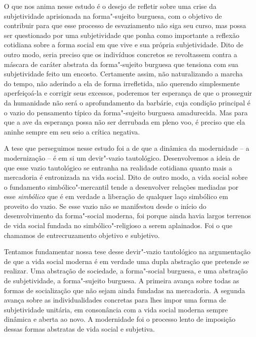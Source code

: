 O que nos anima nesse estudo é o desejo de refletir sobre uma crise da
subjetividade aprisionada na forma"-sujeito burguesa, com o objetivo de
contribuir para que esse processo de esvaziamento não siga seu curso,
mas possa ser questionado por uma subjetividade que ponha como
importante a reflexão cotidiana sobre a forma social em que vive e sua
própria subjetividade. Dito de outro modo, seria preciso que os
indivíduos concretos se revoltassem contra a máscara de caráter abstrata
da forma"-sujeito burguesa que tensiona com sua subjetividade feito um
encosto. Certamente assim, não naturalizando a marcha do tempo, não
aderindo a ela de forma irrefletida, não querendo simplesmente
aperfeiçoá-la e corrigir seus excessos, poderemos ter esperança de que o
prosseguir da humanidade não será o aprofundamento da barbárie, cuja
condição principal é o vazio do pensamento típico da forma"-sujeito
burguesa amadurecida. Mas para que a ave da esperança possa não ser
derrubada em pleno voo, é preciso que ela aninhe sempre em seu seio a
crítica negativa.

A tese que perseguimos nesse estudo foi a de que a dinâmica da
modernidade -- a modernização -- é em si um devir"-vazio tautológico.
Desenvolvemos a ideia de que esse vazio tautológico se entranha na
realidade cotidiana quanto mais a mercadoria é entronizada na vida
social. Dito de outro modo, a vida social sobre o fundamento
simbólico"-mercantil tende a desenvolver relações mediadas por esse
\emph{simbólico} que é em verdade a liberação de qualquer laço simbólico
em proveito do vazio. Se esse vazio não se manifestou desde o início do
desenvolvimento da forma"-social moderna, foi porque ainda havia largos
terrenos de vida social fundada no simbólico"-religioso a serem
aplainados. Foi o que chamamos de entrecruzamento objetivo e subjetivo.

Tentamos fundamentar nossa tese desse devir"-vazio tautológico na
argumentação de que a vida social moderna é em verdade uma dupla
abstração que pretende se realizar. Uma abstração de sociedade, a
forma"-social burguesa, e uma abstração de subjetividade, a forma"-sujeito
burguesa. A primeira avança sobre todas as formas de socialização que
não sejam ainda fundadas na mercadoria. A segunda avança sobre as
individualidades concretas para lhes impor uma forma de subjetividade
unitária, em consonância com a vida social moderna sempre dinâmica e
aberta ao novo. A modernidade foi o processo lento de imposição dessas
formas abstratas de vida social e subjetiva.

